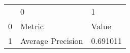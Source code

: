\begin{tabular}{lll}
 & 0 & 1 \\
0 & Metric & Value \\
1 & Average Precision & 0.691011 \\
\end{tabular}
